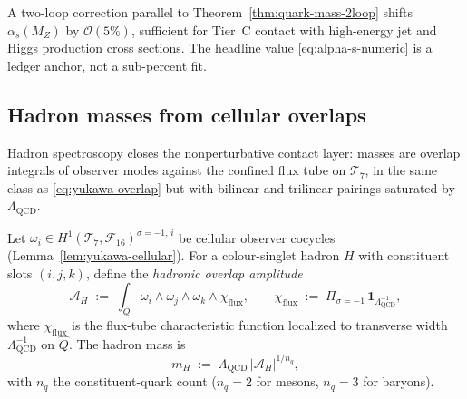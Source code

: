 \begin{remark}
A two-loop correction parallel to Theorem~\ref{thm:quark-mass-2loop} shifts
$\alpha_s(M_Z)$ by $\mathcal{O}(5\%)$, sufficient for Tier~C contact with
high-energy jet and Higgs production cross sections. The headline value
\eqref{eq:alpha-s-numeric} is a ledger anchor, not a sub-percent fit.
\end{remark}

\subsection{Hadron masses from cellular overlaps}
\label{sec:qcd:hadrons}

Hadron spectroscopy closes the nonperturbative contact layer: masses are
overlap integrals of observer modes against the confined flux tube on
$\mathcal{T}_7$, in the same class as \eqref{eq:yukawa-overlap} but with
bilinear and trilinear pairings saturated by $\Lambda_{\mathrm{QCD}}$.

\begin{definition}
\label{def:hadron-overlap}
Let $\omega_i\in H^1(\mathcal{T}_7,\mathcal{F}_{16})^{\sigma=-1,\,i}$ be
cellular observer cocycles (Lemma~\ref{lem:yukawa-cellular}). For a colour-singlet
hadron $H$ with constituent slots $(i,j,k)$, define the \emph{hadronic
overlap amplitude}
\begin{equation}\label{eq:hadron-overlap}
  \mathcal{A}_H
  \;:=\;
  \int_{\hat Q}
  \omega_i \wedge \omega_j \wedge \omega_k \wedge \chi_{\mathrm{flux}},
  \qquad
  \chi_{\mathrm{flux}}
  \;:=\;
  \Pi_{\sigma=-1}\,\mathbf{1}_{\Lambda_{\mathrm{QCD}}^{-1}},
\end{equation}
where $\chi_{\mathrm{flux}}$ is the flux-tube characteristic function
localized to transverse width $\Lambda_{\mathrm{QCD}}^{-1}$ on $\hat Q$.
The hadron mass is
\begin{equation}\label{eq:hadron-mass-def}
  m_H
  \;:=\;
  \Lambda_{\mathrm{QCD}}\,
  |\mathcal{A}_H|^{\!1/n_q},
\end{equation}
with $n_q$ the constituent-quark count ($n_q=2$ for mesons, $n_q=3$ for
baryons).
\end{definition}

